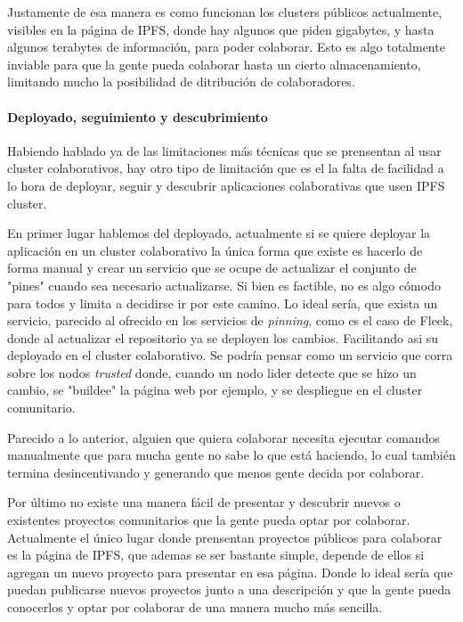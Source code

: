 Justamente de esa manera es como funcionan los clusters públicos actualmente, visibles en la página de IPFS\cite{collaborative-clusters}, donde hay algunos que piden gigabytes, y hasta algunos terabytes de información, para poder colaborar. Esto es algo totalmente inviable para que la gente pueda colaborar hasta un cierto almacenamiento, limitando mucho la posibilidad de ditribución de colaboradores.

\paragraph{Deployado, seguimiento y descubrimiento}

Habiendo hablado ya de las limitaciones más técnicas que se prensentan al usar cluster colaborativos, hay otro tipo de limitación que es el la falta de facilidad a lo hora de deployar, seguir y descubrir aplicaciones colaborativas que usen IPFS cluster.

En primer lugar hablemos del deployado, actualmente si se quiere deployar la aplicación en un cluster colaborativo la única forma que existe es hacerlo de forma manual y crear un servicio que se ocupe de actualizar el conjunto de "pines" cuando sea necesario actualizarse. Si bien es factible, no es algo cómodo para todos y limita a decidirse ir por este camino. Lo ideal sería, que exista un servicio, parecido al ofrecido en los servicios de \textit{pinning}, como es el caso de Fleek\cite{fleek}, donde al actualizar el repositorio ya se deployen los cambios. Facilitando asi su deployado en el cluster colaborativo. Se podría pensar como un servicio que corra sobre los nodos \textit{trusted} donde, cuando un nodo lider detecte que se hizo un cambio, se "buildee" la página web por ejemplo, y se despliegue en el cluster comunitario.

Parecido a lo anterior, alguien que quiera colaborar necesita ejecutar comandos manualmente que para mucha gente no sabe lo que está haciendo, lo cual también termina desincentivando y generando que menos gente decida por colaborar.

Por último no existe una manera fácil de presentar y descubrir nuevos o existentes proyectos comunitarios que la gente pueda optar por colaborar. Actualmente el único lugar donde prensentan proyectos públicos para colaborar es la página de IPFS\cite{collaborative-clusters}, que ademas se ser bastante simple, depende de ellos si agregan un nuevo proyecto para presentar en esa página. Donde lo ideal sería que puedan publicarse nuevos proyectos junto a una descripción y que la gente pueda conocerlos y optar por colaborar de una manera mucho más sencilla.

